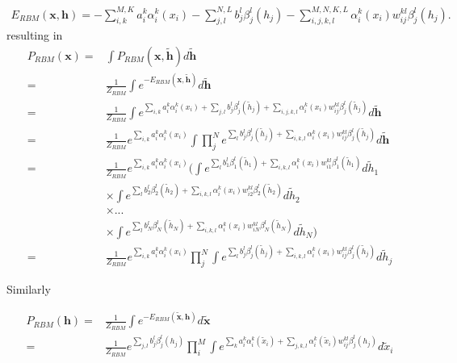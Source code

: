 \documentclass[%
oneside,                 %
final,                   %
10pt]{article}
\begin{document}
\begin{align}
	E_{RBM}(\bm{x}, \bm{h}) = - \sum_{i, k}^{M, K} a_i^k \alpha_i^k (x_i)
	- \sum_{j, l}^{N, L} b_j^l \beta_j^l (h_j) 
	- \sum_{i,j,k,l}^{M,N,K,L} \alpha_i^k (x_i) w_{ij}^{kl} \beta_j^l (h_j). 
\end{align}
resulting in 
\begin{align}
	P_{RBM} (\bm{x}) =& \int P_{RBM} (\bm{x}, \tilde{\bm{h}})  d \tilde{\bm{h}} \nonumber \\
	=& \frac{1}{Z_{RBM}} \int e^{-E_{RBM} (\bm{x}, \tilde{\bm{h}}) } d\tilde{\bm{h}} \nonumber \\
	=& \frac{1}{Z_{RBM}} \int e^{\sum_{i, k} a_i^k \alpha_i^k (x_i)
	+ \sum_{j, l} b_j^l \beta_j^l (\tilde{h}_j) 
	+ \sum_{i,j,k,l} \alpha_i^k (x_i) w_{ij}^{kl} \beta_j^l (\tilde{h}_j)} 
	d\tilde{\bm{h}} \nonumber \\
	=& \frac{1}{Z_{RBM}} e^{\sum_{i, k} a_i^k \alpha_i^k (x_i)}
	\int \prod_j^N e^{\sum_l b_j^l \beta_j^l (\tilde{h}_j) 
	+ \sum_{i,k,l} \alpha_i^k (x_i) w_{ij}^{kl} \beta_j^l (\tilde{h}_j)} d\tilde{\bm{h}} \nonumber \\
	=& \frac{1}{Z_{RBM}} e^{\sum_{i, k} a_i^k \alpha_i^k (x_i)}
	\biggl( \int e^{\sum_l b_1^l \beta_1^l (\tilde{h}_1) + \sum_{i,k,l} \alpha_i^k (x_i) w_{i1}^{kl} \beta_1^l (\tilde{h}_1)} d \tilde{h}_1 \nonumber \\
	& \times \int e^{\sum_l b_2^l \beta_2^l (\tilde{h}_2) + \sum_{i,k,l} \alpha_i^k (x_i) w_{i2}^{kl} \beta_2^l (\tilde{h}_2)} d \tilde{h}_2 \nonumber \\
	& \times ... \nonumber \\
	& \times \int e^{\sum_l b_N^l \beta_N^l (\tilde{h}_N) + \sum_{i,k,l} \alpha_i^k (x_i) w_{iN}^{kl} \beta_N^l (\tilde{h}_N)} d \tilde{h}_N \biggr) \nonumber \\
	=& \frac{1}{Z_{RBM}} e^{\sum_{i, k} a_i^k \alpha_i^k (x_i)}
	\prod_j^N \int e^{\sum_l b_j^l \beta_j^l (\tilde{h}_j) + \sum_{i,k,l} \alpha_i^k (x_i) w_{ij}^{kl} \beta_j^l (\tilde{h}_j)}  d\tilde{h}_j
\end{align}

Similarly

\begin{align}
	P_{RBM} (\bm{h}) =& \frac{1}{Z_{RBM}} \int e^{-E_{RBM} (\tilde{\bm{x}}, \bm{h})} d\tilde{\bm{x}} \nonumber \\
	=& \frac{1}{Z_{RBM}} e^{\sum_{j, l} b_j^l \beta_j^l (h_j)}
	\prod_i^M \int e^{\sum_k a_i^k \alpha_i^k (\tilde{x}_i)
	+ \sum_{j,k,l} \alpha_i^k (\tilde{x}_i) w_{ij}^{kl} \beta_j^l (h_j)} d\tilde{x}_i
\end{align}
\end{document}
